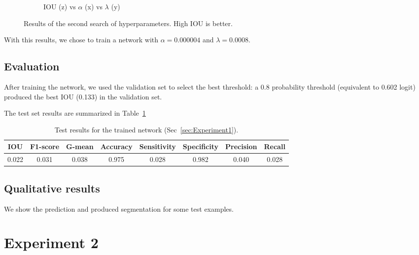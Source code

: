 \begin{figure}[h]
\begin{subfigure}{0.32\textwidth}
         \caption{IOU (z) vs $\alpha$ (x) vs $\lambda$ (y)}
	\end{subfigure}
	\caption[Second hyperparameter search for Experiment 1]{Results of the second search of hyperparameters. High IOU is better.}
	 \label{fig:Hs2}
\end{figure}

With this results, we chose to train a network with $\alpha = 0.000004$ and $\lambda = 0.0008$.

\subsection{Evaluation}
After training the network, we used the validation set to select the best threshold: a 0.8 probability threshold (equivalent to 0.602 logit) produced the best IOU (0.133) in the validation set.

The test set results are summarized in Table~\ref{tab:Results1}
\begin{table}[h]
	\centering
	\begin{tabular}{cccccccc}
	\hline
	\textbf{IOU}	& \textbf{F1-score}	& \textbf{G-mean} &\textbf{Accuracy}	& \textbf{Sensitivity} & \textbf{Specificity} & \textbf{Precision} & \textbf{Recall}\\
	\hline
	0.022 & 0.031 & 0.038 & 0.975 & 0.028 & 0.982 & 0.040 & 0.028\\
	\hline
	\end{tabular}
	\caption[Results for Experiment 1]{Test results for the trained network (Sec~\ref{sec:Experiment1}).}
	\label{tab:Results1}
\end{table}

\subsection{Qualitative results}
We show the prediction and produced segmentation for some test examples.%


\section{Experiment 2}
